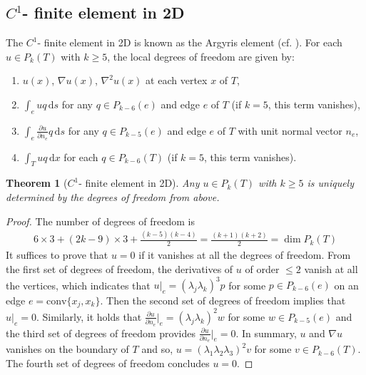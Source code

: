 \documentclass[a4paper]{amsart}
\numberwithin{equation}{section}
\newcommand\ds{\,\text{d}s}
\newcommand\dx{\,\text{d}x}
\newtheorem{theorem}{Theorem}[section]
\theoremstyle{definition}
\theoremstyle{remark}
\numberwithin{theorem}{section}
\numberwithin{equation}{section}
\numberwithin{table}{section}
\numberwithin{figure}{section}
\begin{document}
\subsection{$C^1$- finite element in 2D}\label{appendix-1}
The $C^1$- finite element in 2D is known as the Argyris element (cf. \cite[Section 6]{Ciarlet2002}). For each $u\in P_k(T)$ with $k\geq 5$, the local degrees of freedom are given by:
\begin{enumerate}
	\item $u(x)$, $\nabla u(x)$, $\nabla^2u(x)$ at each vertex $x$ of $T$,
	\item $\int_e u q \ds$ for any $q\in P_{k-6}(e)$ and edge $e$ of $T$ (if $k=5$, this term vanishes),
	\item $\int_e \tfrac{\partial u}{\partial n_e} q \ds$ for any $q \in P_{k-5}(e)$ and edge $e$ of $T$ with unit normal vector $n_e$,
	\item $\int_T u q \dx$ for each $q\in P_{k-6}(T)$ (if $k=5$, this term vanishes).
\end{enumerate}
\begin{theorem}[$C^1$- finite element in 2D]\label{thm:C1_2D}
	Any $u\in P_k(T)$ with $k\geq 5$ is uniquely determined by the degrees of freedom from above.
\end{theorem}
\begin{proof}
	The number of degrees of freedom is
	\begin{align*}
		6\times 3 + (2k-9)\times 3 + \tfrac{(k-5)(k-4)}{2} = \tfrac{(k+1)(k+2)}{2}=\operatorname{dim}P_{k}(T)
	\end{align*}
	It suffices to prove that $u =0$ if it vanishes at all the degrees of freedom.
	From the first set of degrees of freedom, the derivatives of $u$ of order $\leq 2$ vanish at all the vertices, which indicates that $u|_e = (\lambda_j\lambda_k)^3p$ for some $p\in P_{k-6}(e)$ on an edge $e = \mathrm{conv}\{x_j,x_k\}$. Then the second set of degrees of freedom implies that $u|_e = 0$. Similarly, it holds that $\tfrac{\partial u}{\partial n_e}|_e = (\lambda_j\lambda_k)^2w$ for some $w\in P_{k-5}(e)$ and the third set of degrees of freedom provides $\tfrac{\partial u}{\partial n_e}|_e =0$. In summary, $u$ and $\nabla u$ vanishes on the boundary of $T$ and so, $u = (\lambda_1\lambda_2\lambda_3)^2v$ for some $v\in P_{k-6}(T)$. The fourth set of degrees of freedom concludes $u =0$.
\end{proof}
\end{document}
